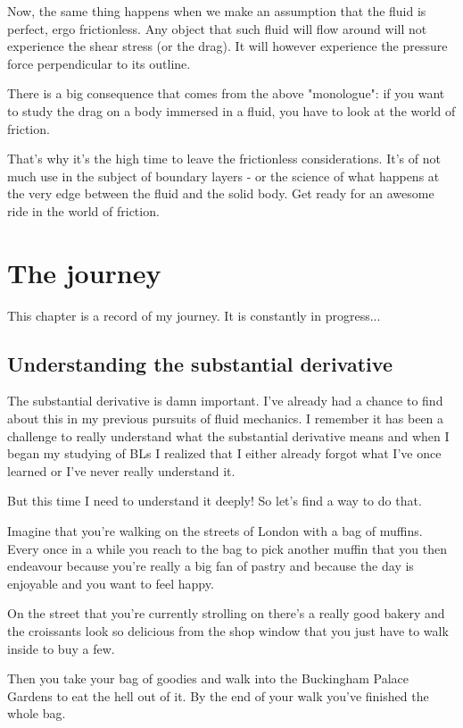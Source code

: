\documentclass[12pt]{report}
\begin{document}
Now, the same thing happens when we make an assumption that the fluid is perfect, ergo frictionless. Any object that such fluid will flow around will not experience the shear stress (or the drag). It will however experience the pressure force perpendicular to its outline.

There is a big consequence that comes from the above "monologue": if you want to study the drag on a body immersed in a fluid, you have to look at the world of friction.

That's why it's the high time to leave the frictionless considerations. It's of not much use in the subject of boundary layers - or the science of what happens at the very edge between the fluid and the solid body. Get ready for an awesome ride in the world of friction.



\chapter{The journey}


This chapter is a record of my journey. It is constantly in progress...

\section{Understanding the substantial derivative} \label{chap:deriv}

The substantial derivative is damn important. I've already had a chance to find about this in my previous pursuits of fluid mechanics. I remember it has been a challenge to really understand what the substantial derivative means and when I began my studying of BLs I realized that I either already forgot what I've once learned or I've never really understand it.

But this time I need to understand it deeply! So let's find a way to do that.

Imagine that you're walking on the streets of London with a bag of muffins. Every once in a while you reach to the bag to pick another muffin that you then endeavour because you're really a big fan of pastry and because the day is enjoyable and you want to feel happy.

On the street that you're currently strolling on there's a really good bakery and the croissants look so delicious from the shop window that you just have to walk inside to buy a few.

Then you take your bag of goodies and walk into the Buckingham Palace Gardens to eat the hell out of it. By the end of your walk you've finished the whole bag.
\end{document}
